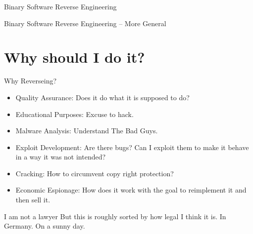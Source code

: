 \documentclass{beamer}
\begin{document}
  \begin{frame}{Binary Software Reverse Engineering}
    \begin{adjustbox}{max totalsize={.9\textwidth}{.7\textheight},center}
    \end{adjustbox}
  \end{frame}

  \begin{frame}{Binary Software Reverse Engineering -- More General}
    \begin{adjustbox}{max totalsize={.9\textwidth}{.7\textheight},center}
    \end{adjustbox}
  \end{frame}

  \section{Why should I do it?}
  \begin{frame}{Why Reverseing?}
    \begin{itemize}
      \item Quality Assurance\pause: Does it do what it is supposed to do?\pause
      \item Educational Purposes\pause: Excuse to hack.\pause
      \item Malware Analysis\pause: Understand The Bad Guys\texttrademark.\pause
      \item Exploit Development\pause: Are there bugs? Can I exploit them to make it behave in a way it was not intended?\pause
      \item Cracking\pause: How to circumvent copy right protection?\pause
      \item Economic Espionage\pause: How does it work with the goal to reimplement it and then sell it.
    \end{itemize}
    \pause
    \begin{alertblock}{I am not a lawyer}\pause
      But this is roughly sorted by how legal I think it is. \pause In Germany. \pause On a sunny day.
    \end{alertblock}
  \end{frame}
\end{document}
